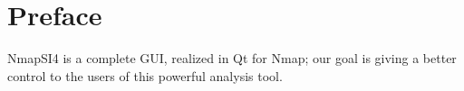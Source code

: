 
\chapter*{Preface}
\label{ch:Preface}

NmapSI4 is a complete GUI, realized in Qt for Nmap; our goal is giving a 
better control to the users of this powerful analysis tool. 

